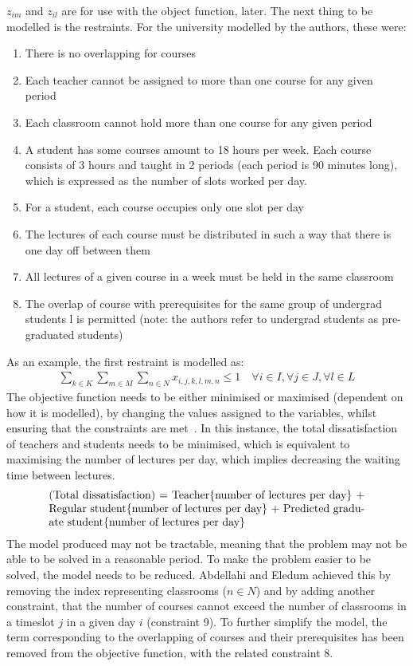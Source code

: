 \( z_{im} \) and \( z_{il} \) are for use with the object function, later. The
next thing to be modelled is the restraints.
For the university modelled by the authors, these were:

\begin{enumerate}
	\item There is no overlapping for courses
	\item Each teacher cannot be assigned to more than one course for any given
		period
	\item Each classroom cannot hold more than one course for any given period
	\item A student has some courses amount to 18 hours per week. Each course
		consists of 3 hours and taught in 2 periods (each period is 90 minutes
		long), which is expressed as the number of slots worked per day.
	\item For a student, each course occupies only one slot per day
	\item The lectures of each course must be distributed in such a way that
		there is one day off between them
	\item All lectures of a given course in a week must be held in the same
		classroom
	\item The overlap of course with prerequisites for the same group of
		undergrad students l is permitted (note: the authors refer to undergrad 
		students as pre-graduated students)
\end{enumerate}

As an example, the first restraint is modelled as:
\begin{align*}
	\sum_{k \in K} \sum_{m \in M} \sum_{n \in N} x_{i,j,k,l,m,n} \leq 1 \quad
	\forall i \in I, \forall j \in J, \forall l \in L
\end{align*}
The objective function needs to be either minimised or maximised (dependent on
how it is modelled), by changing the values assigned to the variables, whilst
ensuring that the constraints are met~\cite{objective_function}.
In this instance, the total dissatisfaction of teachers and students needs to be
minimised, which is equivalent to maximising the number of lectures per day,
which implies decreasing the waiting time between lectures.
\begin{align*}
	\parbox[t]{10cm}{(Total dissatisfaction) = Teacher\{number of lectures per
	day\} + Regular student\{number of lectures per day\} + Predicted graduate
	student\{number of lectures per day\}}
\end{align*}
The model produced may not be tractable, meaning that the problem may not be
able to be solved in a reasonable period.
To make the problem easier to be solved, the model needs to be reduced.
Abdellahi and Eledum achieved this by removing the index representing
classrooms (\( n\in N \)) and by adding another constraint, that the number of
courses cannot exceed the number of classrooms in a timeslot \( j \) in a given
day \( i \) (constraint 9).
To further simplify the model, the term corresponding to the overlapping of
courses and their prerequisites has been removed from the objective function,
with the related constraint 8.

